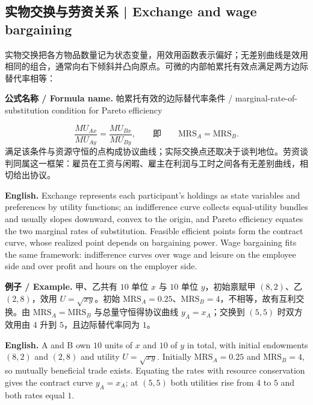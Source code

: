 \documentclass[UTF8,11pt,a4paper]{ctexart}
\newcommand{\EN}[1]{\par\noindent\textbf{English.} #1\par}
\newcommand{\FORMULA}[2]{\par\noindent\textbf{公式名称 / Formula name.} #1 / #2\par}
\newcommand{\EX}[2]{\par\noindent\textbf{例子 / Example.} #1\par\EN{#2}}
\begin{document}
\subsection{实物交换与劳资关系 | Exchange and wage bargaining}
实物交换把各方物品数量记为状态变量，用效用函数表示偏好；无差别曲线是效用相同的组合，通常向右下倾斜并凸向原点。可微的内部帕累托有效点满足两方边际替代率相等：
\FORMULA{帕累托有效的边际替代率条件}{marginal-rate-of-substitution condition for Pareto efficiency}
\[
\frac{MU_{Ax}}{MU_{Ay}}=\frac{MU_{Bx}}{MU_{By}},
\qquad\text{即}\qquad \mathrm{MRS}_A=\mathrm{MRS}_B .
\]
满足该条件与资源守恒的点构成协议曲线；实际交换点还取决于谈判地位。劳资谈判同属这一框架：雇员在工资与闲暇、雇主在利润与工时之间各有无差别曲线，相切给出协议。
\EN{Exchange represents each participant's holdings as state variables and preferences by utility functions; an indifference curve collects equal-utility bundles and usually slopes downward, convex to the origin, and Pareto efficiency equates the two marginal rates of substitution. Feasible efficient points form the contract curve, whose realized point depends on bargaining power. Wage bargaining fits the same framework: indifference curves over wage and leisure on the employee side and over profit and hours on the employer side.}
\EX{甲、乙共有 $10$ 单位 $x$ 与 $10$ 单位 $y$，初始禀赋甲 $(8,2)$、乙 $(2,8)$，效用 $U=\sqrt{xy}$。初始 $\mathrm{MRS}_A=0.25$、$\mathrm{MRS}_B=4$，不相等，故有互利交换。由 $\mathrm{MRS}_A=\mathrm{MRS}_B$ 与总量守恒得协议曲线 $y_A=x_A$；交换到 $(5,5)$ 时双方效用由 $4$ 升到 $5$，且边际替代率同为 $1$。}{A and B own $10$ units of $x$ and $10$ of $y$ in total, with initial endowments $(8,2)$ and $(2,8)$ and utility $U=\sqrt{xy}$. Initially $\mathrm{MRS}_A=0.25$ and $\mathrm{MRS}_B=4$, so mutually beneficial trade exists. Equating the rates with resource conservation gives the contract curve $y_A=x_A$; at $(5,5)$ both utilities rise from $4$ to $5$ and both rates equal $1$.}
\end{document}
